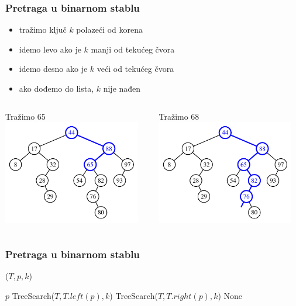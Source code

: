 \documentclass[compress]{beamer}
\begin{document}
\begin{frame}[fragile]
  \frametitle{Pretraga u binarnom stablu}
  \begin{itemize}
    \item tražimo ključ $k$ polazeći od korena
    \item idemo levo ako je $k$ manji od tekućeg čvora
    \item idemo desno ako je $k$ veći od tekućeg čvora
    \item ako dođemo do lista, $k$ nije nađen
  \end{itemize}
  \begin{columns}
    \begin{column}[c]{6cm}
      \begin{center}
        Tražimo 65
        \includegraphics[width=6cm]{asp-11-pic03a.pdf}
      \end{center}
    \end{column}  
    \begin{column}[c]{6cm}
      \begin{center}
        Tražimo 68
        \includegraphics[width=6cm]{asp-11-pic03b.pdf}
      \end{center}
    \end{column}  
  \end{columns}
\end{frame}

\renewcommand{\algorithmiccomment}[1]{\hfill \{\myred{#1}\}}

\begin{frame}[fragile]
  \frametitle{Pretraga u binarnom stablu}
($T, p, k$)
\begin{algorithmic}
  \RETURN $p$ 
  \RETURN TreeSearch($T, T.left(p), k$) 
  \RETURN TreeSearch($T, T.right(p), k$) 
\ENDIF
\RETURN None  
\end{algorithmic}
\end{frame}
\end{document}
